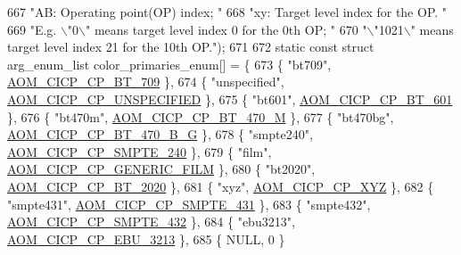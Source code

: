 \begin{DoxyCodeInclude}
{{{{{{{667             \textcolor{stringliteral}{"AB: Operating point(OP) index; "}
668             \textcolor{stringliteral}{"xy: Target level index for the OP. "}
669             \textcolor{stringliteral}{"E.g. \(\backslash\)"0\(\backslash\)" means target level index 0 for the 0th OP; "}
670             \textcolor{stringliteral}{"\(\backslash\)"1021\(\backslash\)" means target level index 21 for the 10th OP."});
671 
672 \textcolor{keyword}{static} \textcolor{keyword}{const} \textcolor{keyword}{struct }arg\_enum\_list color\_primaries\_enum[] = \{
673   \{ \textcolor{stringliteral}{"bt709"}, \hyperlink{aom__image_8h_a5267ad095a088ece3499336812503cefa9a2ebe055c0508a2a2f72b6c192fcce9}{AOM\_CICP\_CP\_BT\_709} \},
674   \{ \textcolor{stringliteral}{"unspecified"}, \hyperlink{aom__image_8h_a5267ad095a088ece3499336812503cefa0835a3af8e6ffc6df298b6e64f878431}{AOM\_CICP\_CP\_UNSPECIFIED} \},
675   \{ \textcolor{stringliteral}{"bt601"}, \hyperlink{aom__image_8h_a5267ad095a088ece3499336812503cefa3ce81eb125550ec2f11a58f183eeaee6}{AOM\_CICP\_CP\_BT\_601} \},
676   \{ \textcolor{stringliteral}{"bt470m"}, \hyperlink{aom__image_8h_a5267ad095a088ece3499336812503cefa5b57cb26f04f4df6585335129392d5e2}{AOM\_CICP\_CP\_BT\_470\_M} \},
677   \{ \textcolor{stringliteral}{"bt470bg"}, \hyperlink{aom__image_8h_a5267ad095a088ece3499336812503cefa8b33dc8483c16048c606d75d9f11e38a}{AOM\_CICP\_CP\_BT\_470\_B\_G} \},
678   \{ \textcolor{stringliteral}{"smpte240"}, \hyperlink{aom__image_8h_a5267ad095a088ece3499336812503cefa1a8b2e5694489121f80a406d9da25dfb}{AOM\_CICP\_CP\_SMPTE\_240} \},
679   \{ \textcolor{stringliteral}{"film"}, \hyperlink{aom__image_8h_a5267ad095a088ece3499336812503cefa8dd6ba5106c22d149a233e73232aeb65}{AOM\_CICP\_CP\_GENERIC\_FILM} \},
680   \{ \textcolor{stringliteral}{"bt2020"}, \hyperlink{aom__image_8h_a5267ad095a088ece3499336812503cefa6bb95baf09cd6e1f3596b459712c592a}{AOM\_CICP\_CP\_BT\_2020} \},
681   \{ \textcolor{stringliteral}{"xyz"}, \hyperlink{aom__image_8h_a5267ad095a088ece3499336812503cefa6032cae72a729933a6a75e3b943a542c}{AOM\_CICP\_CP\_XYZ} \},
682   \{ \textcolor{stringliteral}{"smpte431"}, \hyperlink{aom__image_8h_a5267ad095a088ece3499336812503cefa54d519c9ac0ca52ebda7caf736530e57}{AOM\_CICP\_CP\_SMPTE\_431} \},
683   \{ \textcolor{stringliteral}{"smpte432"}, \hyperlink{aom__image_8h_a5267ad095a088ece3499336812503cefa227b6e4116ed0266af20b705aebaf661}{AOM\_CICP\_CP\_SMPTE\_432} \},
684   \{ \textcolor{stringliteral}{"ebu3213"}, \hyperlink{aom__image_8h_a5267ad095a088ece3499336812503cefa9e74dcb338953bfab3101aa33ea44157}{AOM\_CICP\_CP\_EBU\_3213} \},
685   \{ NULL, 0 \}
}}}}}}}
\end{DoxyCodeInclude}
